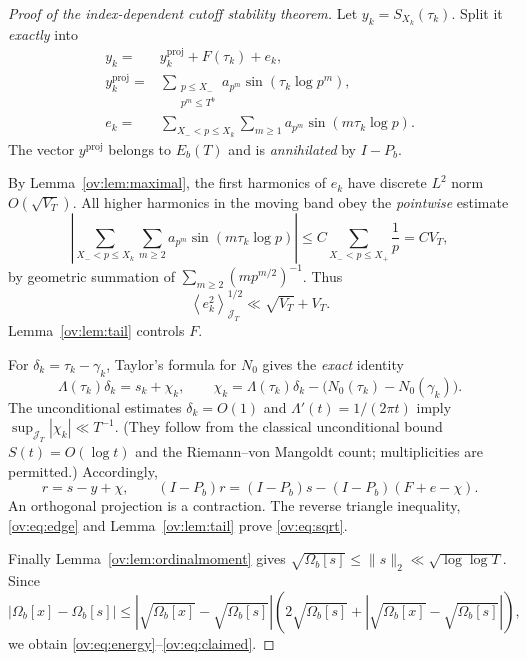 \documentclass[11pt,reqno]{amsart}
\numberwithin{equation}{section}
\newcommand{\lamb}{\Lambda}
\newcommand{\avgJ}[1]{\left\langle #1\right\rangle_{\mathcal J_T}}
\begin{document}
\begin{proof}[Proof of the index-dependent cutoff stability theorem]
Let $y_k=S_{X_k}(\tau_k)$. Split it \emph{exactly} into
\begin{equation}
\begin{split}
y_k={}&y_k^{\mathrm{proj}}+F(\tau_k)+e_k,\\
y_k^{\mathrm{proj}}={}&\sum_{\substack{p\le X_-\\p^m\le T^b}}a_{p^m}\sin(\tau_k\log p^m),\\
e_k={}&\sum_{X_-<p\le X_k}\sum_{m\ge1}a_{p^m}\sin(m\tau_k\log p).
\end{split}
\label{ov:eq:split}
\end{equation}
The vector $y^{\mathrm{proj}}$ belongs to $E_b(T)$ and is \emph{annihilated} by $I-P_b$.

By Lemma~\ref{ov:lem:maximal}, the first harmonics of $e_k$ have discrete $L^2$ norm $O(\sqrt{V_T})$. All higher harmonics in the moving band obey the \emph{pointwise} estimate
\begin{equation}
\left|\sum_{X_-<p\le X_k}\sum_{m\ge2}a_{p^m}\sin(m\tau_k\log p)\right|
\le C\sum_{X_-<p\le X_+}\frac1p=C V_T,
\end{equation}
by geometric summation of $\sum_{m\ge2}(mp^{m/2})^{-1}$. Thus
\begin{equation}
\avgJ{e_k^2}^{1/2}\ll\sqrt{V_T}+V_T.
\label{ov:eq:edge}
\end{equation}
Lemma~\ref{ov:lem:tail} controls $F$.

For $\delta_k=\tau_k-\gamma_k$, Taylor's formula for $N_0$ gives the \emph{exact} identity
\begin{equation}
\lamb(\tau_k)\delta_k=s_k+\chi_k,
\qquad \chi_k=\lamb(\tau_k)\delta_k-\bigl(N_0(\tau_k)-N_0(\gamma_k)\bigr).
\label{ov:eq:chi}
\end{equation}
The unconditional estimates $\delta_k=O(1)$ and $\lamb'(t)=1/(2\pi t)$ imply $\sup_{\mathcal J_T}|\chi_k|\ll T^{-1}$. (They follow from the classical unconditional bound $S(t)=O(\log t)$ and the Riemann--von Mangoldt count; multiplicities are permitted.) Accordingly,
\begin{equation}
r=s-y+\chi,
\qquad(I-P_b)r=(I-P_b)s-(I-P_b)(F+e-\chi).
\end{equation}
An orthogonal projection is a contraction. The reverse triangle inequality, \eqref{ov:eq:edge} and Lemma~\ref{ov:lem:tail} prove \eqref{ov:eq:sqrt}.

Finally Lemma~\ref{ov:lem:ordinalmoment} gives $\sqrt{\Omega_b[s]}\le\|s\|_2\ll\sqrt{\log\log T}$. Since
\[|\Omega_b[x]-\Omega_b[s]|\le
\left|\sqrt{\Omega_b[x]}-\sqrt{\Omega_b[s]}\right|
\left(2\sqrt{\Omega_b[s]}+
\left|\sqrt{\Omega_b[x]}-\sqrt{\Omega_b[s]}\right|\right),\]
we obtain \eqref{ov:eq:energy}--\eqref{ov:eq:claimed}.
\end{proof}
\end{document}
